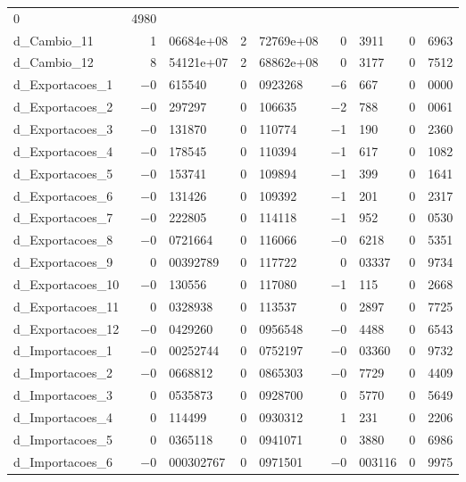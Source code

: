 \documentclass[11pt]{article}
\begin{document}
\begin{center}
\begin{tabular}{lr@{,}lr@{,}lr@{,}lr@{,}l}
        0&4980 \\
d\_Cambio\_11 &
  1&06684\textrm{e+08} &
    2&72769\textrm{e+08} &
      0&3911 &
        0&6963 \\
d\_Cambio\_12 &
  8&54121\textrm{e+07} &
    2&68862\textrm{e+08} &
      0&3177 &
        0&7512 \\
d\_Exportacoes\_1 &
  $-$0&615540 &
    0&0923268 &
      $-$6&667 &
        0&0000 \\
d\_Exportacoes\_2 &
  $-$0&297297 &
    0&106635 &
      $-$2&788 &
        0&0061 \\
d\_Exportacoes\_3 &
  $-$0&131870 &
    0&110774 &
      $-$1&190 &
        0&2360 \\
d\_Exportacoes\_4 &
  $-$0&178545 &
    0&110394 &
      $-$1&617 &
        0&1082 \\
d\_Exportacoes\_5 &
  $-$0&153741 &
    0&109894 &
      $-$1&399 &
        0&1641 \\
d\_Exportacoes\_6 &
  $-$0&131426 &
    0&109392 &
      $-$1&201 &
        0&2317 \\
d\_Exportacoes\_7 &
  $-$0&222805 &
    0&114118 &
      $-$1&952 &
        0&0530 \\
d\_Exportacoes\_8 &
  $-$0&0721664 &
    0&116066 &
      $-$0&6218 &
        0&5351 \\
d\_Exportacoes\_9 &
  0&00392789 &
    0&117722 &
      0&03337 &
        0&9734 \\
d\_Exportacoes\_10 &
  $-$0&130556 &
    0&117080 &
      $-$1&115 &
        0&2668 \\
d\_Exportacoes\_11 &
  0&0328938 &
    0&113537 &
      0&2897 &
        0&7725 \\
d\_Exportacoes\_12 &
  $-$0&0429260 &
    0&0956548 &
      $-$0&4488 &
        0&6543 \\
d\_Importacoes\_1 &
  $-$0&00252744 &
    0&0752197 &
      $-$0&03360 &
        0&9732 \\
d\_Importacoes\_2 &
  $-$0&0668812 &
    0&0865303 &
      $-$0&7729 &
        0&4409 \\
d\_Importacoes\_3 &
  0&0535873 &
    0&0928700 &
      0&5770 &
        0&5649 \\
d\_Importacoes\_4 &
  0&114499 &
    0&0930312 &
      1&231 &
        0&2206 \\
d\_Importacoes\_5 &
  0&0365118 &
    0&0941071 &
      0&3880 &
        0&6986 \\
d\_Importacoes\_6 &
  $-$0&000302767 &
    0&0971501 &
      $-$0&003116 &
        0&9975 \\

\end{tabular}
\end{center}
\end{document}
